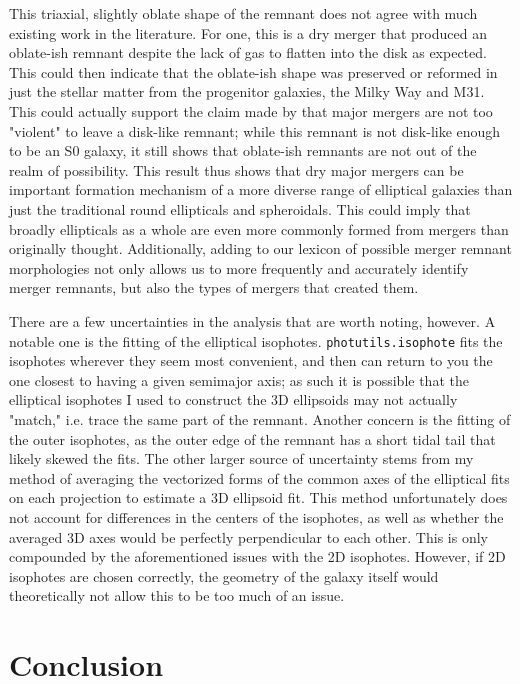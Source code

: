 \documentclass[twocolumn]{aastex631}
\begin{document}
This triaxial, slightly oblate shape of the remnant does not agree with much existing work in the literature. 
For one, this is a dry merger that produced an oblate-ish remnant despite the lack of gas to flatten into the disk as \cite{Barnes+1992} expected. 
This could then indicate that the oblate-ish shape was preserved or reformed in just the stellar matter from the progenitor galaxies, the Milky Way and M31. 
This could actually support the claim made by \cite{Eliche-Moral+2018} that major mergers are not too "violent" to leave a disk-like remnant; while this remnant is not disk-like enough to be an S0 galaxy, it still shows that oblate-ish remnants are not out of the realm of possibility.
This result thus shows that dry major mergers can be important formation mechanism of a more diverse range of elliptical galaxies than just the traditional round ellipticals and spheroidals. 
This could imply that broadly ellipticals as a whole are even more commonly formed from mergers than originally thought.
Additionally, adding to our lexicon of possible merger remnant morphologies not only allows us to more frequently and accurately identify merger remnants, but also the types of mergers that created them.

There are a few uncertainties in the analysis that are worth noting, however. 
A notable one is the fitting of the elliptical isophotes.
\texttt{photutils.isophote} fits the isophotes wherever they seem most convenient, and then can return to you the one closest to having a given semimajor axis; as such it is possible that the elliptical isophotes I used to construct the 3D ellipsoids may not actually "match," i.e. trace the same part of the remnant. 
Another concern is the fitting of the outer isophotes, as the outer edge of the remnant has a short tidal tail that likely skewed the fits.
The other larger source of uncertainty stems from my method of averaging the vectorized forms of the common axes of the elliptical fits on each projection to estimate a 3D ellipsoid fit. 
This method unfortunately does not account for differences in the centers of the isophotes, as well as whether the averaged 3D axes would be perfectly perpendicular to each other.
This is only compounded by the aforementioned issues with the 2D isophotes.
However, if 2D isophotes are chosen correctly, the geometry of the galaxy itself would theoretically not allow this to be too much of an issue.


\section{Conclusion}
\end{document}
